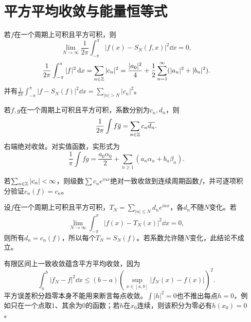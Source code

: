 \section{平方平均收敛与能量恒等式}
\begin{result}[平方平均收敛与Parseval等式]\label{st:Parseval}
若$f$在一个周期上可积且平方可积，则
\[
 \lim_{N\to\infty}\frac1{2\pi}\int_{-\pi}^{\pi}|f(x)-S_N(f,x)|^2\dd x=0,
\]
\[
 \frac1{2\pi}\int_{-\pi}^{\pi}|f|^2\,\mathrm d x
 =\sum_{n\in\mathbb Z}|c_n|^2
 =\frac{|a_0|^2}{4}+\frac12\sum_{n=1}^\infty(|a_n|^2+|b_n|^2).
\]
并有$\frac1{2\pi}\int_{-\pi}^{\pi}|f-S_N(f)|^2\dd x=\sum_{|n|>N}|c_n|^2$。
\end{result}
\begin{result}[混合Parseval等式]\label{st:mixed}
若$f,g$在一个周期上可积且平方可积，系数分别为$c_n,d_n$，则
\[
 \frac1{2\pi}\int f\overline g=\sum_{n\in\mathbb Z}c_n\overline{d_n}.
\]
右端绝对收敛。对实值函数，实形式为
\[
 \frac1\pi\int fg=\frac{a_0\alpha_0}{2}
 +\sum_{n\ge1}(a_n\alpha_n+b_n\beta_n).
\]
\end{result}
\begin{result}[绝对可和系数的实现]\label{st:RF}
若$\sum_{n\in\mathbb Z}|c_n|<\infty$，则级数$\sum c_ne^{inx}$绝对一致收敛到连续周期函数$f$，并可逐项积分验证$c_n(f)=c_n$。
\end{result}
\begin{result}[固定系数的平方平均展开唯一性]\label{st:fixed}
设$f$在一个周期上可积且平方可积，$T_N=\sum_{|n|\le N}d_ne^{inx}$，各$d_n$不随$N$变化。若
\[
 \lim_{N\to\infty}\int_{-\pi}^{\pi}|f(x)-T_N(x)|^2\dd x=0,
\]
则所有$d_n=c_n(f)$，所以每个$T_N=S_N(f)$。若系数允许随$N$变化，此结论不成立。
\end{result}
\begin{result}[平方平均与点值的区别]\label{st:notpointwise}
有限区间上一致收敛蕴含平方平均收敛，因为
\[
 \int_a^b|f_N-f|^2\dd x\le(b-a)\left(\sup_{x\in[a,b]}|f_N(x)-f(x)|\right)^2.
\]
平方误差积分趋零本身不能用来断言每点收敛。$\int|h|^2=0$也不推出每点$h=0$，例如只在一个点取$1$、其余为$0$的函数；若$h$在$x_0$连续，则该积分为零必有$h(x_0)=0$。
\end{result}

